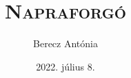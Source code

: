\documentclass{book}
\begin{document}
\begin{titlepage}

\title{\textsc{Napraforgó}}
\author{Berecz Antónia}
\date{2022. július 8.}
\maketitle

\end{titlepage}
\end{document}
